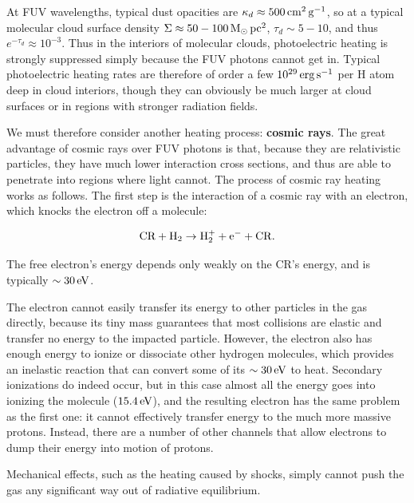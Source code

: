 \documentclass[a4paper,10pt]{article}
\begin{document}
{\noindent}At FUV wavelengths, typical dust opacities are $\kappa_d\approx500\,{\rm cm^2\,g^{-1}}$, so at a typical molecular cloud surface density $\Sigma\approx50-100\,{\rm M_\odot\,pc^2}$, $\tau_d\sim5-10$, and thus $e^{-\tau_d}\approx10^{-3}$. Thus in the interiors of molecular clouds, photoelectric heating is strongly suppressed simply because the FUV photons cannot get in. Typical photoelectric heating rates are therefore of order a few $10^{29}\,{\rm erg\,s^{-1}}$ per H atom deep in cloud interiors, though they can obviously be much larger at cloud surfaces or in regions with stronger radiation fields.

{\noindent}We must therefore consider another heating process: \textbf{cosmic rays}. The great advantage of cosmic rays over FUV photons is that, because they are relativistic particles, they have much lower interaction cross sections, and thus are able to penetrate into regions where light cannot. The process of cosmic ray heating works as follows. The first step is the interaction of a cosmic ray with an electron, which knocks the electron off a molecule:

\begin{align*}
    {\rm CR + H_2 \rightarrow H_2^+ + e^- + CR}.
\end{align*}

{\noindent}The free electron's energy depends only weakly on the CR's energy, and is typically $\sim30\,{\rm eV}$.

{\noindent}The electron cannot easily transfer its energy to other particles in the gas directly, because its tiny mass guarantees that most collisions are elastic and transfer no energy to the impacted particle. However, the electron also has enough energy to ionize or dissociate other hydrogen molecules, which provides an inelastic reaction that can convert some of its $\sim30\,{\rm eV}$ to heat. Secondary ionizations do indeed occur, but in this case almost all the energy goes into ionizing the molecule ($15.4\,{\rm eV}$), and the resulting electron has the same problem as the first one: it cannot effectively transfer energy to the much more massive protons. Instead, there are a number of other channels that allow electrons to dump their energy into motion of protons.

{\noindent}Mechanical effects, such as the heating caused by shocks, simply cannot push the gas any significant way out of radiative equilibrium.
\end{document}
